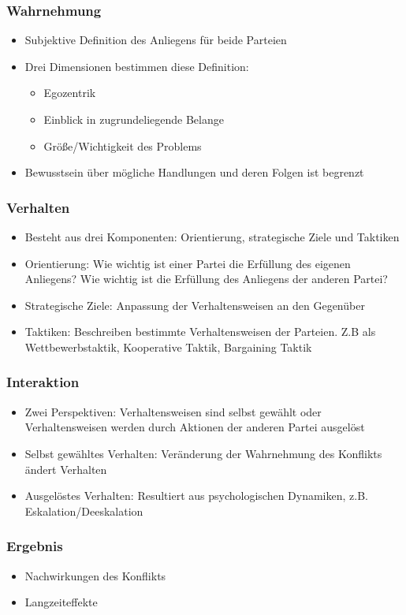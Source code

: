 \documentclass[12pt,a4paper]{beamer}
\begin{document}
\begin{frame}
	\frametitle{Wahrnehmung}
	\begin{itemize}
		\item Subjektive Definition des Anliegens für beide Parteien
		\item Drei Dimensionen bestimmen diese Definition:
		\begin{itemize}
			\item Egozentrik
			\item Einblick in zugrundeliegende Belange
			\item Größe/Wichtigkeit des Problems
		\end{itemize}
		\item Bewusstsein über mögliche Handlungen und deren Folgen ist begrenzt
	\end{itemize}
\end{frame}

\begin{frame}
	\frametitle{Verhalten}
	\begin{itemize}
		\item Besteht aus drei Komponenten: Orientierung, strategische Ziele und Taktiken
		\item Orientierung: Wie wichtig ist einer Partei die Erfüllung des eigenen Anliegens? Wie wichtig ist die Erfüllung des Anliegens der anderen Partei?
		\item Strategische Ziele: Anpassung der Verhaltensweisen an den Gegenüber
		\item Taktiken: Beschreiben bestimmte Verhaltensweisen der Parteien. Z.B als Wettbewerbstaktik, Kooperative Taktik, Bargaining Taktik
	\end{itemize}
\end{frame}

\begin{frame}
	\frametitle{Interaktion}
	\begin{itemize}
		\item Zwei Perspektiven: Verhaltensweisen sind selbst gewählt oder Verhaltensweisen werden durch Aktionen der anderen Partei ausgelöst
		\item Selbst gewähltes Verhalten: Veränderung der Wahrnehmung des Konflikts ändert Verhalten
		\item Ausgelöstes Verhalten: Resultiert aus psychologischen Dynamiken, z.B. Eskalation/Deeskalation
	\end{itemize}
\end{frame}

\begin{frame}
	\frametitle{Ergebnis}
	\begin{itemize}
		\item Nachwirkungen des Konflikts
		\item Langzeiteffekte 
	\end{itemize}
\end{frame}
\end{document}
